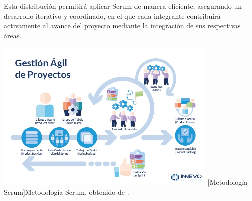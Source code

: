 Esta distribución permitirá aplicar Scrum de manera eficiente, asegurando un desarrollo iterativo y coordinado, en el que cada integrante contribuirá activamente al avance del proyecto mediante la integración de sus respectivas áreas.


\begin{center}
    \includegraphics[width=0.8\textwidth]{Images/Cap 1/metoscrum.jpg}
    [Metodología Scrum]{Metodología Scrum, obtenido de \cite{ref19}.}  %
\end{center}
